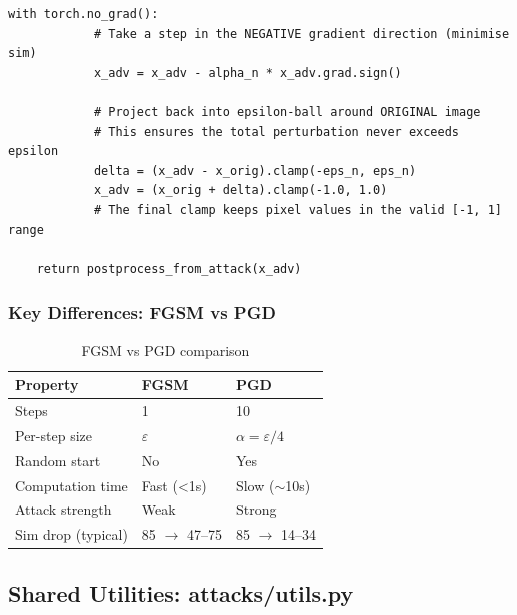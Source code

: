 \documentclass[12pt,a4paper]{article}
\begin{document}
\begin{lstlisting}[caption={attacks/pgd.py -- Complete listing with line-by-line explanation}]
        with torch.no_grad():
            # Take a step in the NEGATIVE gradient direction (minimise sim)
            x_adv = x_adv - alpha_n * x_adv.grad.sign()

            # Project back into epsilon-ball around ORIGINAL image
            # This ensures the total perturbation never exceeds epsilon
            delta = (x_adv - x_orig).clamp(-eps_n, eps_n)
            x_adv = (x_orig + delta).clamp(-1.0, 1.0)
            # The final clamp keeps pixel values in the valid [-1, 1] range

    return postprocess_from_attack(x_adv)
\end{lstlisting}

\subsubsection{Key Differences: FGSM vs PGD}

\begin{table}[H]
\centering
\caption{FGSM vs PGD comparison}
\begin{tabular}{@{}lll@{}}
\toprule
\textbf{Property} & \textbf{FGSM} & \textbf{PGD} \\
\midrule
Steps & 1 & 10 \\
Per-step size & $\varepsilon$ & $\alpha = \varepsilon/4$ \\
Random start & No & Yes \\
Computation time & Fast (\textless 1s) & Slow ($\sim$10s) \\
Attack strength & Weak & Strong \\
Sim drop (typical) & 85 $\to$ 47--75 & 85 $\to$ 14--34 \\
\bottomrule
\end{tabular}
\end{table}

\subsection{Shared Utilities: attacks/utils.py}
\end{document}
